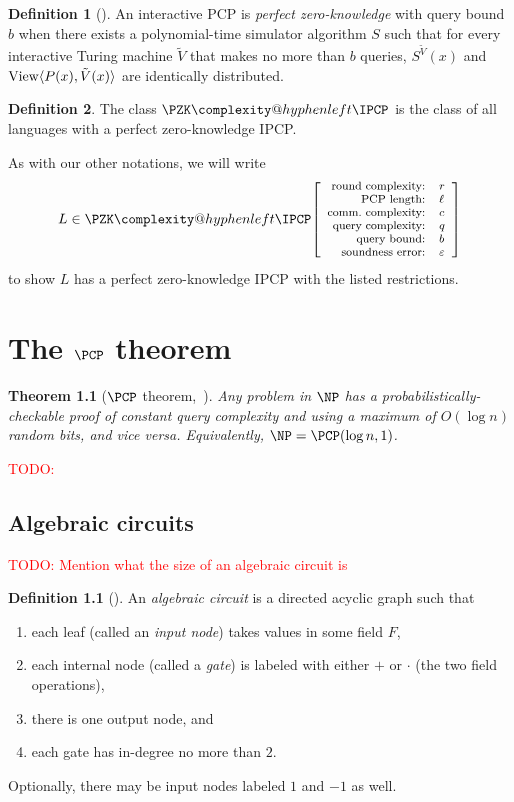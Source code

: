 \documentclass[english,12pt]{reedthesis}
\makeatletter
\theoremstyle{plain}
\newtheorem{thm}{Theorem}[section]
\theoremstyle{definition}
\newtheorem{defn}[defn]{Definition}
\theoremstyle{remark}
\DeclareMathOperator{\View}{View}
\DeclarePairedDelimiter{\ang}{\langle}{\rangle}
\newcommand{\pzkipcp}[6]{%
  \ensuremath%
  \mleft[{\footnotesize\begin{array}{r l}
    \text{round complexity:} & #1 \\
    \text{PCP length:} & #2 \\
    \text{comm.\ complexity:} & #3 \\
    \text{query complexity:} & #4 \\
    \text{query bound:} & #5 \\
    \text{soundness error:} & #6
  \end{array}}\mright]%
}
\newcommand{\PZKIPCP}{%
  \PZK\complexity@hyphenleft\IPCP
}
\newcommand{\TODO}[1]{\textcolor{red}{TODO: #1}}
\makeatother
\begin{document}
\begin{defn}[{\cite[]{CFGS22}}]\label{def:zk-ipcp}
  An interactive PCP is \emph{perfect zero-knowledge} with query bound $b$ when
  there exists a polynomial-time simulator algorithm $S$ such that for every
  interactive Turing machine $\tilde{V}$ that makes no more than $b$ queries,
  $S^{\tilde{V}}(x)$ and $\View\ang{P(x), \tilde{V}(x)}$ are identically
  distributed.
\end{defn}

\begin{defn}\label{def:pzkipcp}\index{PZK-IPCP@$\PZKIPCP$}
  The class $\PZKIPCP$ is the class of all languages with a perfect
  zero-knowledge IPCP\@.
\end{defn}

As with our other notations, we will write
\[
  L \in \PZKIPCP\pzkipcp{r}{\ell}{c}{q}{b}{\varepsilon}
\]
to show $L$ has a perfect zero-knowledge IPCP with the listed restrictions.

\chapter{The $\PCP$ theorem}\label{chap:pcp-theorem}

\begin{thm}[{$\PCP$ theorem,~\cite{AS98}}]\label{thm:pcp-theorem}
  Any problem in $\NP$ has a probabilistically-checkable proof of constant query
  complexity and using a maximum of $O(\log n)$ random bits, and vice versa.
  Equivalently, $\NP = \PCP(\log n, 1)$.
\end{thm}

\TODO{}

\section{Algebraic circuits}\label{sec:alg-circuit}

\TODO{Mention what the size of an algebraic circuit is}

\begin{defn}[{\cite[]{AB09}}]\label{def:alg-circuit}
  An \emph{algebraic circuit} is a directed acyclic graph such that
  \begin{enumerate}
    \item each leaf (called an \emph{input node}) takes values in some field
          $F$,
    \item each internal node (called a \emph{gate}) is labeled with either $+$
          or $\cdot$ (the two field operations),
    \item there is one output node, and
    \item each gate has in-degree no more than $2$.
  \end{enumerate}
  Optionally, there may be input nodes labeled $1$ and $-1$ as well.
\end{defn}
\end{document}

